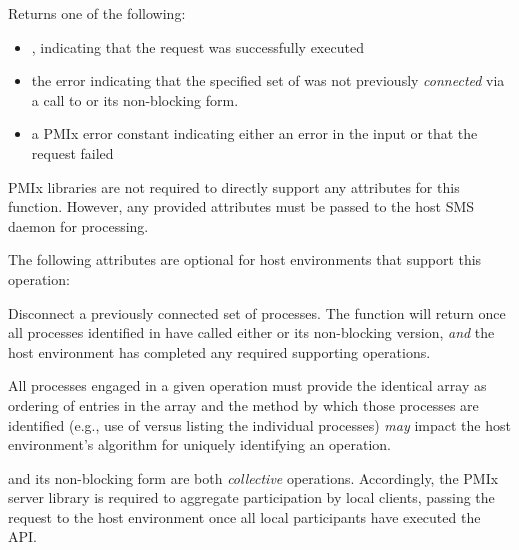 \begin{arglist}
\end{arglist}

Returns one of the following:

\begin{itemize}
    \item {}, indicating that the request was successfully executed
    \item the  error indicating that the specified set of  was not previously \textit{connected} via a call to  or its non-blocking form.
    \item a PMIx error constant indicating either an error in the input or that the request failed
\end{itemize}


\reqattrstart
\ac{PMIx} libraries are not required to directly support any attributes for this function. However, any provided attributes must be passed to the host \ac{SMS} daemon for processing.

\reqattrend

\optattrstart
The following attributes are optional for host environments that support this operation:


\optattrend

\descr

Disconnect a previously connected set of processes. The function will return once all processes identified in  have called either  or its non-blocking version, \textit{and} the host environment has completed any required supporting operations.

\adviceuserstart
All processes engaged in a given  operation must provide the identical  array as ordering of entries in the array and the method by which those processes are identified (e.g., use of  versus listing the individual processes) \textit{may} impact the host environment's algorithm for uniquely identifying an operation.
\adviceuserend

\adviceimplstart
{} and its non-blocking form are both \emph{collective} operations. Accordingly, the \ac{PMIx} server library is required to aggregate participation by local clients, passing the request to the host environment once all local participants have executed the \ac{API}.
\adviceimplend

